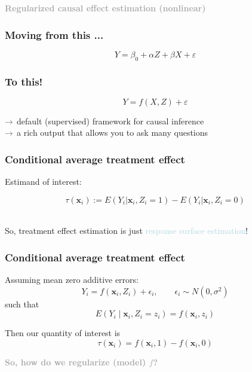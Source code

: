 \documentclass{beamer}
\newcommand{\bo}[1]{\textcolor{burntorange}{#1}}
\newcommand{\lb}[1]{\textcolor{lightblue}{#1}}
\newcommand{\dg}[1]{\textcolor{darkgray}{#1}}
\newcommand{\sk}{\vspace{.5cm}}
\newcommand{\sko}{\vspace{.1in}}
\begin{document}
\begin{frame}

\sk\sk
	\dg{\large \bf Regularized causal effect estimation (\bo{nonlinear})}
\end{frame}

\begin{frame}
	\frametitle{Moving from this ...}
\Large
$$Y = \beta_0 + \alpha Z + \beta X + \varepsilon$$ 	
	
\end{frame}


\begin{frame}
	\frametitle{To this!}
\Large
$$Y = f(X,Z) +  \varepsilon$$ 	

\sk
\pause
\small
${\dg{\rightarrow}}$ \normalsize default (supervised) framework for causal inference \\ \sko
${\dg{\rightarrow}}$ \normalsize a rich output that allows you to ask many questions
\end{frame}


\begin{frame}
	\frametitle{Conditional average treatment effect}
	
	Estimand of interest: \\ \sk
	
	\[\tau(\mathbf{x}_i) := E(Y_i|\mathbf{x}_i,Z_i=1) - E(Y_i|\mathbf{x}_i,Z_i=0)\] \\ \sk\sko
	
	So, treatment effect estimation is just \lb{response surface estimation}!
	
\end{frame}


\begin{frame}
	\frametitle{Conditional average treatment effect}
	
	Assuming mean zero additive errors: \\
	
$$Y_i = f(\mathbf{x}_i, Z_i) + \epsilon_i, \qquad \epsilon_i \sim N(0,\sigma^2)$$ \sko
 such that $$E(Y_i \mid \mathbf{x}_i,Z_i=z_i) = f(\mathbf{x}_i,z_i)$$

\sk

 Then our quantity of interest is
 $$\tau(\mathbf{x}_i) = f(\mathbf{x}_i,1) - f(\mathbf{x}_i,0)$$
\sk \vspace{-5mm}

\hspace*{20mm}\dg{\bf So, how do we regularize (model) $f$?}  

\end{frame}
\end{document}
